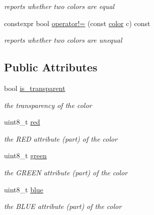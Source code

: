 \begin{DoxyCompactItemize}
\begin{DoxyCompactList}\small\item\em reports whether two colors are equal \end{DoxyCompactList}\item 
constexpr bool \hyperlink{classhwlib_1_1color_a9baf65123cb6bfc8218dd044709d371a}{operator!=} (const \hyperlink{classhwlib_1_1color}{color} c) const \hypertarget{classhwlib_1_1color_a9baf65123cb6bfc8218dd044709d371a}{}\label{classhwlib_1_1color_a9baf65123cb6bfc8218dd044709d371a}

\begin{DoxyCompactList}\small\item\em reports whether two colors are unequal \end{DoxyCompactList}\end{DoxyCompactItemize}
\subsection*{Public Attributes}
\begin{DoxyCompactItemize}
\item 
bool \hyperlink{classhwlib_1_1color_a2bb850a5013f0f4a78b29bd09444fb21}{is\+\_\+transparent}
\begin{DoxyCompactList}\small\item\em the transparency of the color \end{DoxyCompactList}\item 
uint8\+\_\+t \hyperlink{classhwlib_1_1color_a63b0cdaa1bc446995cc8b8724a2ab866}{red}\hypertarget{classhwlib_1_1color_a63b0cdaa1bc446995cc8b8724a2ab866}{}\label{classhwlib_1_1color_a63b0cdaa1bc446995cc8b8724a2ab866}

\begin{DoxyCompactList}\small\item\em the R\+ED attribute (part) of the color \end{DoxyCompactList}\item 
uint8\+\_\+t \hyperlink{classhwlib_1_1color_ab87f25b9aba71151e056b570e7304c89}{green}\hypertarget{classhwlib_1_1color_ab87f25b9aba71151e056b570e7304c89}{}\label{classhwlib_1_1color_ab87f25b9aba71151e056b570e7304c89}

\begin{DoxyCompactList}\small\item\em the G\+R\+E\+EN attribute (part) of the color \end{DoxyCompactList}\item 
uint8\+\_\+t \hyperlink{classhwlib_1_1color_a9d57edec257fb2626157befb791a6a96}{blue}\hypertarget{classhwlib_1_1color_a9d57edec257fb2626157befb791a6a96}{}\label{classhwlib_1_1color_a9d57edec257fb2626157befb791a6a96}

\begin{DoxyCompactList}\small\item\em the B\+L\+UE attribute (part) of the color \end{DoxyCompactList}\end{DoxyCompactItemize}


